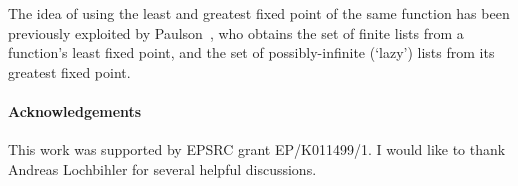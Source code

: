 \documentclass{llncs}
\begin{document}
The idea of using the least and greatest fixed point of the same function has been previously exploited by Paulson~\cite[\S3]{paulson97a}, who obtains the set of finite lists from a function's least fixed point, and the set of possibly-infinite (`lazy') lists from its greatest fixed point.

\paragraph{Acknowledgements} This work was supported by EPSRC grant EP/K011499/1. I would like to thank Andreas Lochbihler for several helpful discussions.



\end{document}
